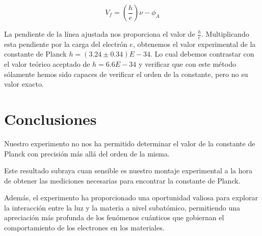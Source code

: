 \documentclass[twocolumn,a4paper,11pt]{scrartcl}
\begin{document}
\begin{equation}
V_f = \left(\frac{h}{e}\right) \nu - \phi_A
\end{equation}

La pendiente de la línea ajustada nos proporciona el valor de $\frac{h}{e}$. Multiplicando esta pendiente por la carga del electrón $e$, obtenemos el valor experimental de la constante de Planck $h = (3.24 \pm 0.34)E-34$. Lo cual debemos contrastar con el valor teórico aceptado de $h = 6.6E-34$ y verificar que con este método sólamente hemos sido capaces de verificar el orden de la constante, pero no su valor exacto.

\section{Conclusiones}

Nuestro experimento no nos ha permitido determinar el valor de la constante de Planck con precisión más allá del orden de la misma.

Este resultado subraya cuan sensible es nuestro montaje experimental a la hora de obtener las mediciones necesarias para encontrar la constante de Planck.

Además, el experimento ha proporcionado una oportunidad valiosa para explorar la interacción entre la luz y la materia a nivel subatómico, permitiendo una apreciación más profunda de los fenómenos cuánticos que gobiernan el comportamiento de los electrones en los materiales.



\end{document}

